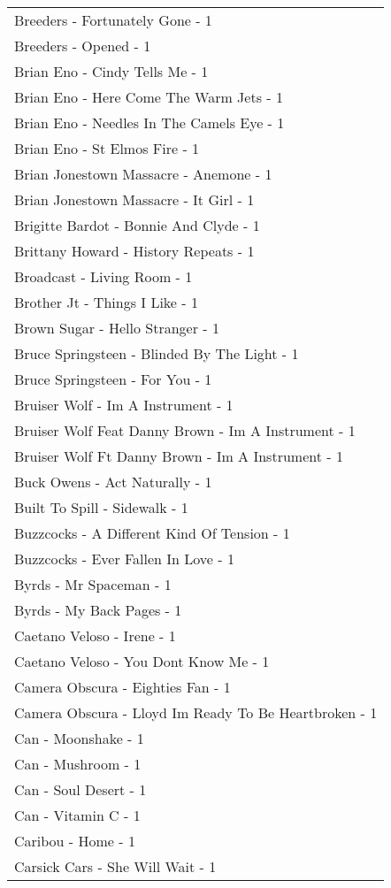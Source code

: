 \documentclass[
]{article}
\begin{document}
\begin{longtable}{l}
Breeders - Fortunately Gone - 1 \\ 
Breeders - Opened - 1 \\ 
Brian Eno - Cindy Tells Me - 1 \\ 
Brian Eno - Here Come The Warm Jets - 1 \\ 
Brian Eno - Needles In The Camels Eye - 1 \\ 
Brian Eno - St Elmos Fire - 1 \\ 
Brian Jonestown Massacre - Anemone - 1 \\ 
Brian Jonestown Massacre - It Girl - 1 \\ 
Brigitte Bardot - Bonnie And Clyde - 1 \\ 
Brittany Howard - History Repeats - 1 \\ 
Broadcast - Living Room - 1 \\ 
Brother Jt - Things I Like - 1 \\ 
Brown Sugar - Hello Stranger - 1 \\ 
Bruce Springsteen - Blinded By The Light - 1 \\ 
Bruce Springsteen - For You - 1 \\ 
Bruiser Wolf - Im A Instrument - 1 \\ 
Bruiser Wolf Feat Danny Brown - Im A Instrument - 1 \\ 
Bruiser Wolf Ft Danny Brown - Im A Instrument - 1 \\ 
Buck Owens - Act Naturally - 1 \\ 
Built To Spill - Sidewalk - 1 \\ 
Buzzcocks - A Different Kind Of Tension - 1 \\ 
Buzzcocks - Ever Fallen In Love - 1 \\ 
Byrds - Mr Spaceman - 1 \\ 
Byrds - My Back Pages - 1 \\ 
Caetano Veloso - Irene - 1 \\ 
Caetano Veloso - You Dont Know Me - 1 \\ 
Camera Obscura - Eighties Fan - 1 \\ 
Camera Obscura - Lloyd Im Ready To Be Heartbroken - 1 \\ 
Can - Moonshake - 1 \\ 
Can - Mushroom - 1 \\ 
Can - Soul Desert - 1 \\ 
Can - Vitamin C - 1 \\ 
Caribou - Home - 1 \\ 
Carsick Cars - She Will Wait - 1 \\ 

\end{longtable}
\end{document}
